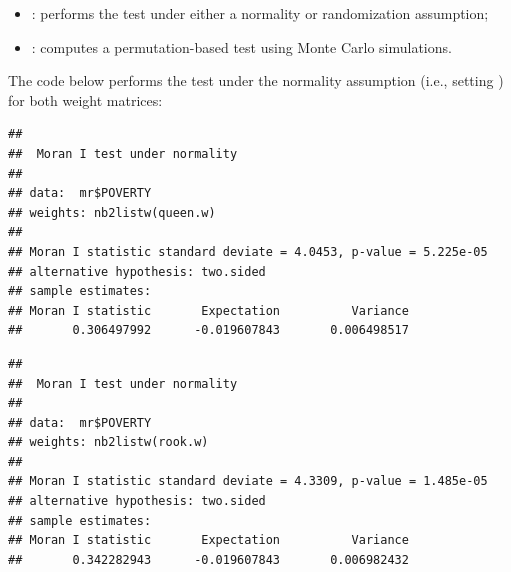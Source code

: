 \begin{itemize}
\item  {}: performs the test under either a normality or randomization assumption;
\item  {}: computes a permutation-based test using Monte Carlo simulations.
\end{itemize}

The code below performs the test under the normality assumption (i.e., setting ) for both weight matrices:

\begin{knitrout}
\color{fgcolor}\begin{kframe}
\begin{alltt}
\hlopt{$}  \hldef{=}   \hldef{=} \hldef{,}
            \hldef{=} \hldef{)}
\end{alltt}
\begin{verbatim}
## 
## 	Moran I test under normality
## 
## data:  mr$POVERTY  
## weights: nb2listw(queen.w)    
## 
## Moran I statistic standard deviate = 4.0453, p-value = 5.225e-05
## alternative hypothesis: two.sided
## sample estimates:
## Moran I statistic       Expectation          Variance 
##       0.306497992      -0.019607843       0.006498517
\end{verbatim}
\begin{alltt}
\hlopt{$}  \hldef{=}   \hldef{=} \hldef{,}
            \hldef{=} \hldef{)}
\end{alltt}
\begin{verbatim}
## 
## 	Moran I test under normality
## 
## data:  mr$POVERTY  
## weights: nb2listw(rook.w)    
## 
## Moran I statistic standard deviate = 4.3309, p-value = 1.485e-05
## alternative hypothesis: two.sided
## sample estimates:
## Moran I statistic       Expectation          Variance 
##       0.342282943      -0.019607843       0.006982432
\end{verbatim}
\end{kframe}
\end{knitrout}

